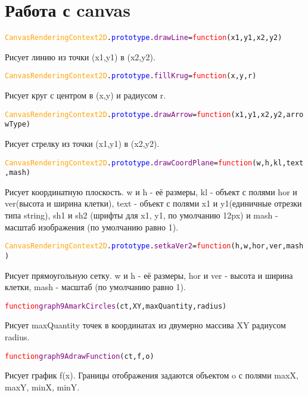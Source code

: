 	\section{Работа с canvas}
		\begin{alltt}
			\textcolor{Orange}{CanvasRenderingContext2D}.\textcolor{Blue}{prototype}.\textcolor{Purple}{drawLine}=\textcolor{Red}{function}(x1,y1,x2,y2)
		\end{alltt}
	Рисует линию из точки (x1,y1) в (x2,y2).
		\begin{alltt}
			\textcolor{Orange}{CanvasRenderingContext2D}.\textcolor{Blue}{prototype}.\textcolor{Purple}{fillKrug}=\textcolor{Red}{function}(x,y,r)
		\end{alltt}
	Рисует круг с центром в (x,y) и радиусом r. 
		\begin{alltt}
			\textcolor{Orange}{CanvasRenderingContext2D}.\textcolor{Blue}{prototype}.\textcolor{Purple}{drawArrow}=\textcolor{Red}{function}(x1, y1, x2, y2, arrowType)
		\end{alltt}%
	Рисует стрелку из точки (x1,y1) в (x2,y2).
		\begin{alltt}
			\textcolor{Orange}{CanvasRenderingContext2D}.\textcolor{Blue}{prototype}.\textcolor{Purple}{drawCoordPlane }=\textcolor{Red}{function}(w, h, kl, text, mash)
		\end{alltt}
	Рисует координатную плоскость. w и h  \-- её размеры, kl \-- объект с полями hor и ver(высота и ширина клетки), text \-- объект с полями x1 и y1(единичные отрезки типа string), sh1 и sh2 (шрифты для x1, y1, по умолчанию 12px) и mash - масштаб изображения (по умолчанию равно 1).
		\begin{alltt}
			\textcolor{Orange}{CanvasRenderingContext2D}.\textcolor{Blue}{prototype}.\textcolor{Purple}{setkaVer2  }=\textcolor{Red}{function}(h, w, hor, ver, mash)
		\end{alltt}
	Рисует прямоугольную сетку. w и h  \-- её размеры, hor и ver \-- высота и ширина клетки, mash - масштаб (по умолчанию равно 1).
		\begin{alltt} 
			\textcolor{Red}{function} \textcolor{Purple}{graph9AmarkCircles}(ct, XY, maxQuantity, radius)
		\end{alltt}	
	Рисует maxQuantity точек в координатах из двумерно массива XY радиусом radius.
		\begin{alltt}
			\textcolor{Red}{function} \textcolor{Purple}{graph9AdrawFunction}(ct, f, o)
		\end{alltt}	
	Рисует график f(x). Границы отображения задаются объектом o с полями maxX, maxY, minX, minY.
